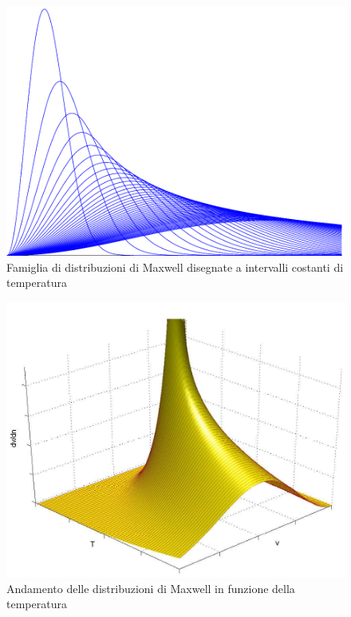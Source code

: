 \begin{figure}[htbp]
\centering
\includegraphics[scale=0.7]{immagini/fisica1/maxwell_famiglia2}
\caption{Famiglia di distribuzioni di Maxwell disegnate a intervalli costanti di temperatura}
\end{figure}

\begin{figure}[htbp]
\centering
\includegraphics[scale=0.8]{immagini/fisica1/maxwell3d}
\caption{Andamento delle distribuzioni di Maxwell in funzione della temperatura}
\end{figure}

